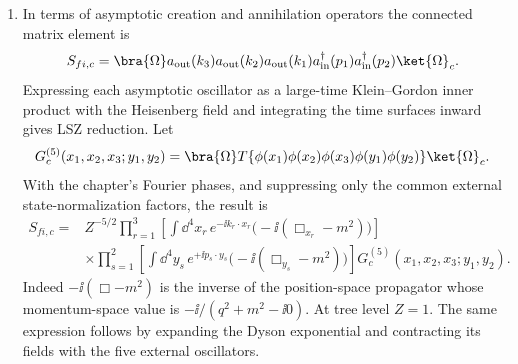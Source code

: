 \begin{enumerate}
\begin{enumerate}
\item
In terms of asymptotic creation and annihilation operators the connected
matrix element is
\[
 S_{fi,c}=
 \bra{\Omega}a_{\mathrm{out}}(k_3)a_{\mathrm{out}}(k_2)
 a_{\mathrm{out}}(k_1)
 a_{\mathrm{in}}^\dagger(p_1)a_{\mathrm{in}}^\dagger(p_2)
 \ket{\Omega}_{c}.
\]
Expressing each asymptotic oscillator as a large-time Klein--Gordon inner
product with the Heisenberg field and integrating the time surfaces inward
gives LSZ reduction.  Let
\[
 G_c^{(5)}(x_1,x_2,x_3;y_1,y_2)
 =\bra{\Omega}T\{\phi(x_1)\phi(x_2)\phi(x_3)
                 \phi(y_1)\phi(y_2)\}\ket{\Omega}_{c}.
\]
With the chapter's Fourier phases, and suppressing only the common external
state-normalization factors, the result is
\[
 \begin{split}
 S_{fi,c}={}&Z^{-5/2}
 \prod_{r=1}^{3}\left[
  \int \dd^4x_r\,e^{-\ii k_r\cdot x_r}
  \bigl(-\ii(\Box_{x_r}-m^2)\bigr)\right]
 \\
 &\times
 \prod_{s=1}^{2}\left[
  \int \dd^4y_s\,e^{+\ii p_s\cdot y_s}
  \bigl(-\ii(\Box_{y_s}-m^2)\bigr)\right]
 G_c^{(5)}(x_1,x_2,x_3;y_1,y_2).
 \end{split}
\]
Indeed \(-\ii(\Box-m^2)\) is the inverse of the position-space propagator
whose momentum-space value is \(-\ii/(q^2+m^2-\ii0)\).  At tree level \(Z=1\).
The same expression follows by expanding the Dyson exponential and
contracting its fields with the five external oscillators.


\end{enumerate}
\end{enumerate}
